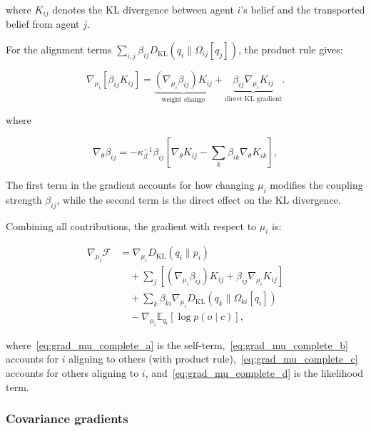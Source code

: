 \documentclass[twoside,11pt]{article}
\begin{document}
where $K_{ij}$ denotes the KL divergence between agent $i$'s belief and the transported belief from agent $j$. 

For the alignment terms $\sum_{i,j} \beta_{ij} D_{\mathrm{KL}}(q_i \| \Omega_{ij}[q_j])$, the product rule gives:

\begin{equation}
\nabla_{\mu_i} \left[\beta_{ij} K_{ij}\right] = 
\underbrace{(\nabla_{\mu_i} \beta_{ij}) K_{ij}}_{\text{weight change}}
+ \underbrace{\beta_{ij} \nabla_{\mu_i} K_{ij}}_{\text{direct KL gradient}}.
\label{eq:product_rule_alignment}
\end{equation}

where

\begin{equation}
\nabla_\theta \beta_{ij} = -\kappa_\beta^{-1} \beta_{ij} \left[\nabla_\theta K_{ij} - \sum_k \beta_{ik} \nabla_\theta K_{ik}\right],
\label{eq:grad_beta}
\end{equation}

The first term in the gradient accounts for how changing $\mu_i$ modifies the coupling strength $\beta_{ij}$, while the second term is the direct effect on the KL divergence.


Combining all contributions, the gradient with respect to $\mu_i$ is:

\begin{align}
\nabla_{\mu_i} \mathcal{F} &= 
\nabla_{\mu_i} D_{\mathrm{KL}}(q_i \| p_i) \label{eq:grad_mu_complete_a} \\
&\quad + \sum_j \left[(\nabla_{\mu_i} \beta_{ij}) K_{ij} + \beta_{ij} \nabla_{\mu_i} K_{ij}\right] \label{eq:grad_mu_complete_b} \\
&\quad + \sum_k \beta_{ki} \nabla_{\mu_i} D_{\mathrm{KL}}(q_k \| \Omega_{ki}[q_i]) \label{eq:grad_mu_complete_c} \\
&\quad - \nabla_{\mu_i} \mathbb{E}_{q_i}[\log p(o \mid c)], \label{eq:grad_mu_complete_d}
\end{align}

where~\eqref{eq:grad_mu_complete_a} is the self-term,~\eqref{eq:grad_mu_complete_b} accounts for $i$ aligning to others (with product rule),~\eqref{eq:grad_mu_complete_c} accounts for others aligning to $i$, and~\eqref{eq:grad_mu_complete_d} is the likelihood term.

\subsubsection{Covariance gradients}
\end{document}

